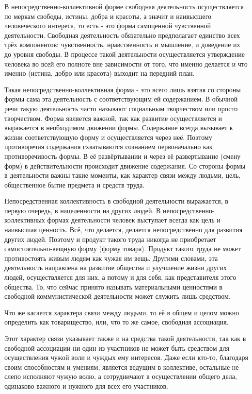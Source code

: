 \documentclass[../main]{subfiles}
\begin{document}
В непосредственно-коллективной форме свободная деятельность осуществляется по меркам свободы, истины, добра и красоты, а значит и наивысшего человеческого интереса, то есть - это форма самоценной чувственной деятельности. Свободная деятельность обязательно предполагает единство всех трёх компонентов: чувственность, нравственность и мышление, и доведение их до уровня свободы. В процессе такой деятельности осуществляется утверждение человека во всей его полноте вне зависимости от того, что именно делается и что именно (истина, добро или красота) выходит на передний план.

Такая непосредственно-коллективная форма - это всего лишь взятая со стороны формы сама эта деятельность с соответствующим ей содержанием. В обычной речи такую деятельность часто называют социальным творчеством или просто творчеством. Форма является важной, так как развитие осуществляется и выражается в необходимом движении формы. Содержание всегда вызывает к жизни соответствующую форму и осуществляется через неё. Поэтому противоречия содержания схватываются сознанием первоначально как противоречивость формы. В её развёртывании и через её развертывание (смену форм) в действительности происходит движение содержания. Со стороны формы в деятельности важны такие моменты, как характер связи между людьми, цель, общественное бытие предмета и средств труда.

Непосредственная коллективность в свободной деятельности выражается, в первую очередь, в нацеленности на других людей. В непосредственно-коллективных формах деятельности человек выступает всегда как цель и наивысшая ценность. Всё, что делается, делается непосредственно для развития других людей. Поэтому и продукт такого труда никогда не приобретает самостоятельно-вещную форму (форму товара). Продукт такого труда не может противостоять живым людям как чужая им вещь. Другими словами, эта деятельность направлена на развитие общества и улучшение жизни других людей, осуществляется для них, а потому и для себя, как представителя этого общества. То, что сейчас принято называть материальными ценностями в свободной коммунистической деятельности может служить лишь средством.

Что же касается характера связи между людьми, то её в общем и целом можно определить как товарищество, или, что то же самое, свободная ассоциация.

Этот характер связи указывает также и на средства такой деятельности, так как в свободной ассоциации ни один из участников не может быть средством для осуществления чужой воли и чуждых ему интересов. Даже если кто-то, благодаря своим способностям и умениям, является ведущим в коллективе, остальные не слепо исполняют чужую волю, а сотрудничают в осуществлении общего дела, одинаково важного и нужного для всех его участников.
\end{document}
